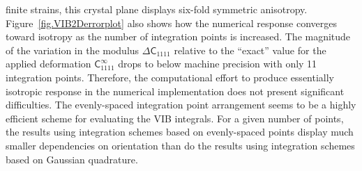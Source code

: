 finite strains, this crystal plane displays six-fold symmetric anisotropy.
Figure~\ref{fig.VIB2Derrorplot} also shows how the numerical response
converges toward isotropy as the number of integration points is increased.
The magnitude of the  variation in the modulus $\Delta \mathsf{C}_{1111}$
relative to the ``exact'' value for the applied deformation 
$\mathsf{C}_{1111}^{\infty}$ drops to below machine precision with only
11 integration points. Therefore, the computational effort to produce
essentially isotropic response in the numerical implementation
does not present significant difficulties. The evenly-spaced
integration point arrangement seems to be a highly efficient scheme for evaluating
the VIB integrals. For a given number of points, the results using integration
schemes based on evenly-spaced points display much
smaller dependencies on orientation than do the results using 
integration schemes based on Gaussian quadrature.


